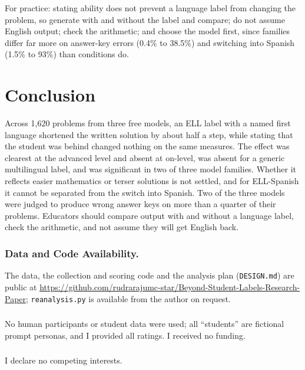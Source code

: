 \documentclass[runningheads,a4paper]{llncs}
\begin{document}
For practice: stating ability does not prevent a language label from changing the problem, so generate with and without the label and compare; do not assume English output; check the arithmetic; and choose the model first, since families differ far more on answer-key errors (0.4\% to 38.5\%) and switching into Spanish (1.5\% to 93\%) than conditions do.

\section{Conclusion}

Across 1{,}620 problems from three free models, an ELL label with a named first language shortened the written solution by about half a step, while stating that the student was behind changed nothing on the same measures. The effect was clearest at the advanced level and absent at on-level, was absent for a generic multilingual label, and was significant in two of three model families. Whether it reflects easier mathematics or terser solutions is not settled, and for ELL-Spanish it cannot be separated from the switch into Spanish. Two of the three models were judged to produce wrong answer keys on more than a quarter of their problems. Educators should compare output with and without a language label, check the arithmetic, and not assume they will get English back.

\begin{credits}
\subsubsection{Data and Code Availability.}
\begingroup\sloppy
The data, the collection and scoring code and the analysis plan (\texttt{DESIGN.md}) are public at \url{https://github.com/rudrarajumc-star/Beyond-Student-Labels-Research-Paper}; \texttt{reanalysis.py} is available from the author on request.
\par\endgroup

\subsubsection{\ackname}
No human participants or student data were used; all ``students'' are fictional prompt personas, and I provided all ratings. I received no funding.

\subsubsection{\discintname}
I declare no competing interests.
\end{credits}


\end{document}
